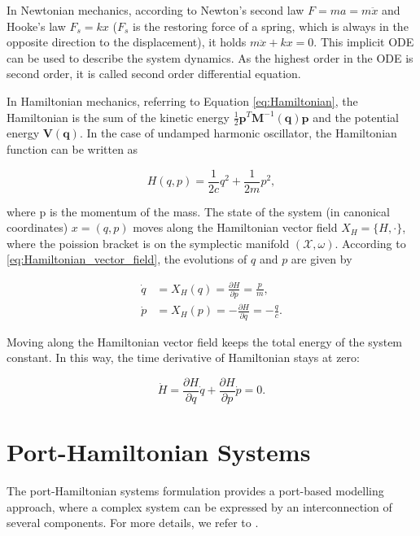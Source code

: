\documentclass[
	parskip, 			   %
	twoside, 			   %
	DIV=14, 			   %
	BCOR=15.0mm, 		   %
	headsepline, 		   %
	open=right, 		   %
	captions=tableheading, %
	bibliography=totoc,    %
	numbers=noenddot       %
]{scrreprt}
\begin{document}
In Newtonian mechanics, according to Newton's second law $F=ma=m\ddot{x}$ and Hooke's law $F_s=kx$ ($F_s$ is the restoring force of a spring, which is always in the opposite direction to the displacement), it holds $m\ddot{x}+kx=0$. This implicit ODE can be used to describe the system dynamics. As the highest order in the ODE is second order, it is called second order differential equation.

In Hamiltonian mechanics, referring to Equation \ref{eq:Hamiltonian}, the Hamiltonian is the sum of the kinetic energy $\frac{1}{2}\mathbf{p}^T\mathbf{M}^{-1}(\mathbf{q})\mathbf{p}$ and the potential energy $\mathbf{V}(\mathbf{q})$. In the case of undamped harmonic oscillator, the Hamiltonian function can be written as

\begin{equation}
    \label{eq:Hamiltonian_udho}
    H(q,p)=\frac{1}{2c}q^2+\frac{1}{2m}p^2,
\end{equation}

where p is the momentum of the mass. The state of the system (in canonical coordinates) $x=(q,p)$ moves along the Hamiltonian vector field $X_{H}=\{H, \cdot\}$, where the poission bracket is on the symplectic manifold $(\mathcal{X},\omega)$. According to \ref{eq:Hamiltonian_vector_field}, the evolutions of $q$ and $p$ are given by

\begin{equation}
    \label{eq:ODE_undamped_harmonic_oscillator}
    \begin{aligned}
        \dot{q}&=X_{H}(q)=\frac{\partial H}{\partial p}=\frac{p}{m},\\
        \dot{p}&=X_{H}(p)=-\frac{\partial H}{\partial q}=-\frac{q}{c}.
    \end{aligned}
\end{equation}

Moving along the Hamiltonian vector field keeps the total energy of the system constant. In this way, the time derivative of Hamiltonian stays at zero:

\begin{equation}
    \label{eq:derivative_Hamiltonian}
    \dot{H}=\frac{\partial H}{\partial q}\dot{q}+\frac{\partial H}{\partial p}\dot{p}=0.
\end{equation}


\section{Port-Hamiltonian Systems}
The port-Hamiltonian systems formulation provides a port-based modelling approach, where a complex system can be expressed by an interconnection of several components. For more details, we refer to \cite{van2014port}.
\end{document}
